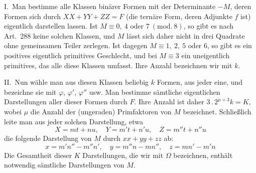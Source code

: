 I.\ Man bestimme alle Klassen binärer Formen mit der Determinante
$-M$, deren Formen sich durch $XX+YY+ZZ=F$ (die ternäre Form, deren
Adjunkte $f$ ist) eigentlich darstellen lassen. Ist $M\equiv0,\allowbreak \ 4\text{ oder }7\ (\mathrm{mod.}\ 8)$,
so gibt es nach Art.\ 288 keine solchen Klassen, und $M$ lässt
sich daher nicht in drei Quadrate ohne gemeinsamen Teiler
zerlegen. Ist dagegen
$M\equiv1,\ 2,\ 5\text{ oder }6$, so gibt es ein positives eigentlich primitives Geschlecht,
und bei $M\equiv3$ ein uneigentlich primitives, das alle diese Klassen
umfasst. Ihre Anzahl bezeichnen wir mit $k$.

II.\ Nun wähle man aus diesen Klassen beliebig $k$ Formen,
aus jeder eine, und bezeichne sie mit $\varphi$, $\varphi'$, $\varphi''$ usw.
Man bestimme sämtliche eigentlichen Darstellungen aller dieser Formen
durch $F$. Ihre Anzahl ist daher $3\, .\, 2^{\mu+3}k=K$, wobei $\mu$ die
Anzahl der (ungeraden) Primfaktoren von $M$ bezeichnet. Schließlich
leite man aus jeder solchen Darstellung, etwa
\[
X=mt+nu,\quad Y=m't+n'u,\quad Z=m''t+n''u
\]
die folgende Darstellung von $M$ durch $xx+yy+zz$ ab:
\[
x=m'n''-m''n',\quad y=m''n-mn'',\quad z=mn'-m'n
\]
Die Gesamtheit dieser $K$ Darstellungen, die wir mit $\Omega$
bezeichnen, enthält notwendig sämtliche Darstellungen von $M$.

